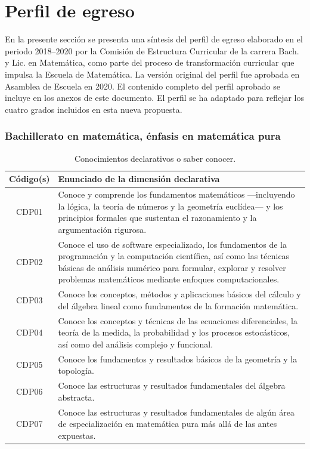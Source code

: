 

\section{Perfil de egreso}

En la presente sección se presenta una síntesis del perfil de egreso elaborado en el periodo 2018–2020 por la Comisión de Estructura Curricular de la carrera Bach. y Lic. en Matemática, como parte del proceso de transformación curricular que impulsa la Escuela de Matemática. La versión original del perfil fue aprobada en Asamblea de Escuela en 2020. El contenido completo del perfil aprobado se incluye en los anexos de este documento. El perfil se ha adaptado para reflejar los cuatro grados incluidos en esta nueva propuesta.


\subsubsection{Bachillerato en matemática, énfasis en matemática pura}


\begin{table}[H]
\centering
\renewcommand{\arraystretch}{1.3}
\begin{tabular}{|c|p{9cm}|}
\hline
\cellcolor[HTML]{00C0F3}\textbf{Código(s)} & \cellcolor[HTML]{00C0F3}\textbf{Enunciado de la dimensión declarativa} \\
\hline
CDP01 & Conoce y comprende los fundamentos matemáticos —incluyendo la lógica, la teoría de números y la geometría euclídea— y los principios formales que sustentan el razonamiento y la argumentación rigurosa. \\
\hline
CDP02 & Conoce el uso de software especializado, los fundamentos de la programación y la computación científica, así como las técnicas básicas de análisis numérico para formular, explorar y resolver problemas matemáticos mediante enfoques computacionales. \\
\hline
CDP03 & Conoce los conceptos, métodos y aplicaciones básicos del cálculo y del álgebra lineal como fundamentos de la formación matemática. \\
\hline
CDP04 & Conoce los conceptos y técnicas de las ecuaciones diferenciales, la teoría de la medida, la probabilidad y los procesos estocásticos, así como del análisis complejo y funcional. \\
\hline
CDP05 & Conoce los fundamentos y resultados básicos de la geometría y la topología. \\
\hline
CDP06 & Conoce las estructuras y resultados fundamentales del álgebra abstracta. 
\\
\hline
CDP07 & Conoce las estructuras y resultados fundamentales de algún área de especialización en matemática pura más allá de las antes expuestas. 
\\
\hline
\end{tabular}
\caption{Conocimientos declarativos o saber conocer.}
\label{tab:declarativa-egreso-integrada}
\end{table}

